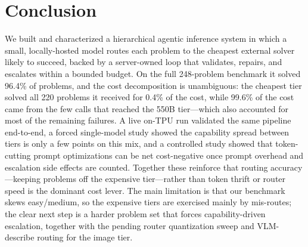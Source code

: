 \documentclass[10pt]{article}
\begin{document}
\section{Conclusion}
\label{sec:conclusion}
We built and characterized a hierarchical agentic inference system in which a small,
locally-hosted model routes each problem to the cheapest external solver likely to
succeed, backed by a server-owned loop that validates, repairs, and escalates within a
bounded budget. On the full 248-problem benchmark it solved 96.4\% of problems, and the
cost decomposition is unambiguous: the cheapest tier solved all 220 problems it
received for 0.4\% of the cost, while 99.6\% of the cost came from the few calls that
reached the 550B tier---which also accounted for most of the remaining failures. A live
on-TPU run validated the same pipeline end-to-end, a forced single-model study showed
the capability spread between tiers is only a few points on this mix, and a controlled
study showed that token-cutting prompt optimizations can be net cost-negative once
prompt overhead and escalation side effects are counted. Together these reinforce that
routing accuracy---keeping problems off the expensive tier---rather than token thrift or
router speed is the dominant cost lever. The main limitation is that our benchmark skews
easy/medium, so the expensive tiers are exercised mainly by mis-routes; the clear next
step is a harder problem set that forces capability-driven escalation, together with the
pending router quantization sweep and VLM-describe routing for the image tier.
\end{document}
